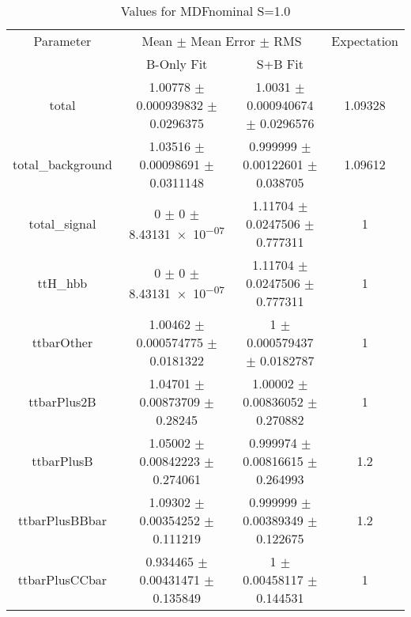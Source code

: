\begin{table}
\centering
\caption{Values for MDFnominal S=1.0}
\begin{tabular}{cccc}
\toprule
Parameter & \multicolumn{2}{c}{Mean $\pm$ Mean Error $\pm$ RMS} & Expectation\\
 & B-Only Fit & S+B Fit & \\
\midrule
total & \num{1.00778} $\pm$ \num{0.000939832} $\pm$ \num{0.0296375} & \num{1.0031} $\pm$ \num{0.000940674} $\pm$ \num{0.0296576} & \num{1.09328}\\
total\_background & \num{1.03516} $\pm$ \num{0.00098691} $\pm$ \num{0.0311148} & \num{0.999999} $\pm$ \num{0.00122601} $\pm$ \num{0.038705} & \num{1.09612}\\
total\_signal & \num{0} $\pm$ \num{0} $\pm$ \num{8.43131e-07} & \num{1.11704} $\pm$ \num{0.0247506} $\pm$ \num{0.777311} & \num{1}\\
ttH\_hbb & \num{0} $\pm$ \num{0} $\pm$ \num{8.43131e-07} & \num{1.11704} $\pm$ \num{0.0247506} $\pm$ \num{0.777311} & \num{1}\\
ttbarOther & \num{1.00462} $\pm$ \num{0.000574775} $\pm$ \num{0.0181322} & \num{1} $\pm$ \num{0.000579437} $\pm$ \num{0.0182787} & \num{1}\\
ttbarPlus2B & \num{1.04701} $\pm$ \num{0.00873709} $\pm$ \num{0.28245} & \num{1.00002} $\pm$ \num{0.00836052} $\pm$ \num{0.270882} & \num{1}\\
ttbarPlusB & \num{1.05002} $\pm$ \num{0.00842223} $\pm$ \num{0.274061} & \num{0.999974} $\pm$ \num{0.00816615} $\pm$ \num{0.264993} & \num{1.2}\\
ttbarPlusBBbar & \num{1.09302} $\pm$ \num{0.00354252} $\pm$ \num{0.111219} & \num{0.999999} $\pm$ \num{0.00389349} $\pm$ \num{0.122675} & \num{1.2}\\
ttbarPlusCCbar & \num{0.934465} $\pm$ \num{0.00431471} $\pm$ \num{0.135849} & \num{1} $\pm$ \num{0.00458117} $\pm$ \num{0.144531} & \num{1}\\
\bottomrule
\end{tabular}
\end{table}